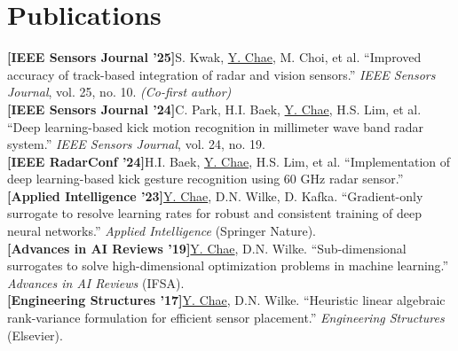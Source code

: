 \documentclass[letterpaper,11pt]{article}
\begin{document}
\section{Publications}
 \begin{itemize}[leftmargin=0.15in, label={}]
    \small{\item{
      \textbf{[IEEE Sensors Journal '25]}\enspace S. Kwak, \underline{Y. Chae}, M. Choi, et al. ``Improved accuracy of track-based integration of radar and vision sensors.'' \textit{IEEE Sensors Journal}, vol. 25, no. 10. \textit{(Co-first author)} \\[1pt]
      \textbf{[IEEE Sensors Journal '24]}\enspace C. Park, H.I. Baek, \underline{Y. Chae}, H.S. Lim, et al. ``Deep learning-based kick motion recognition in millimeter wave band radar system.'' \textit{IEEE Sensors Journal}, vol. 24, no. 19. \\[1pt]
      \textbf{[IEEE RadarConf '24]}\enspace H.I. Baek, \underline{Y. Chae}, H.S. Lim, et al. ``Implementation of deep learning-based kick gesture recognition using 60 GHz radar sensor.'' \\[1pt]
      \textbf{[Applied Intelligence '23]}\enspace \underline{Y. Chae}, D.N. Wilke, D. Kafka. ``Gradient-only surrogate to resolve learning rates for robust and consistent training of deep neural networks.'' \textit{Applied Intelligence} (Springer Nature). \\[1pt]
      \textbf{[Advances in AI Reviews '19]}\enspace \underline{Y. Chae}, D.N. Wilke. ``Sub-dimensional surrogates to solve high-dimensional optimization problems in machine learning.'' \textit{Advances in AI Reviews} (IFSA). \\[1pt]
      \textbf{[Engineering Structures '17]}\enspace \underline{Y. Chae}, D.N. Wilke. ``Heuristic linear algebraic rank-variance formulation for efficient sensor placement.'' \textit{Engineering Structures} (Elsevier).
    }}
 \end{itemize}

\end{document}
